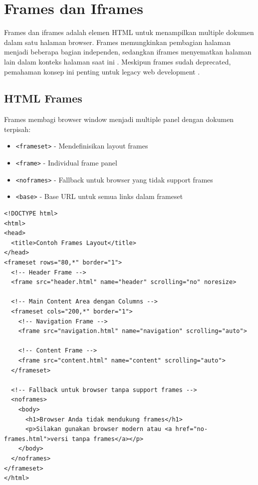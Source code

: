 \section{Frames dan Iframes}

Frames dan iframes adalah elemen HTML untuk menampilkan multiple dokumen dalam satu halaman browser. Frames memungkinkan pembagian halaman menjadi beberapa bagian independen, sedangkan iframes menyematkan halaman lain dalam konteks halaman saat ini \cite{w3schools-html}. Meskipun frames sudah deprecated, pemahaman konsep ini penting untuk legacy web development \cite{mdn-html}.

\subsection{HTML Frames}

Frames membagi browser window menjadi multiple panel dengan dokumen terpisah:

\begin{itemize}
  \item \texttt{<frameset>} - Mendefinisikan layout frames
  \item \texttt{<frame>} - Individual frame panel
  \item \texttt{<noframes>} - Fallback untuk browser yang tidak support frames
  \item \texttt{<base>} - Base URL untuk semua links dalam frameset
\end{itemize}

\begin{lstlisting}[caption={Contoh Frames Layout}, basicstyle=\ttfamily\small, frame=single]
<!DOCTYPE html>
<html>
<head>
  <title>Contoh Frames Layout</title>
</head>
<frameset rows="80,*" border="1">
  <!-- Header Frame -->
  <frame src="header.html" name="header" scrolling="no" noresize>
  
  <!-- Main Content Area dengan Columns -->
  <frameset cols="200,*" border="1">
    <!-- Navigation Frame -->
    <frame src="navigation.html" name="navigation" scrolling="auto">
    
    <!-- Content Frame -->
    <frame src="content.html" name="content" scrolling="auto">
  </frameset>
  
  <!-- Fallback untuk browser tanpa support frames -->
  <noframes>
    <body>
      <h1>Browser Anda tidak mendukung frames</h1>
      <p>Silakan gunakan browser modern atau <a href="no-frames.html">versi tanpa frames</a></p>
    </body>
  </noframes>
</frameset>
</html>
\end{lstlisting}

